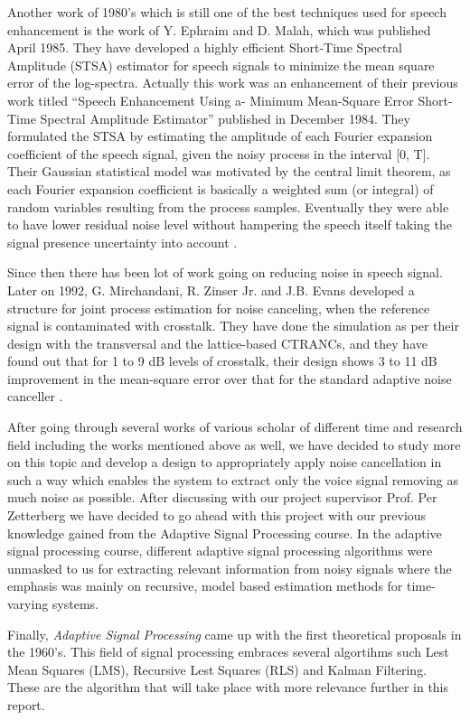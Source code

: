 \documentclass[11pt,a4paper,english]{book}  %
\theoremstyle{definition}  %
\theoremstyle{plain}  %
\theoremstyle{remark}  %
\begin{document}
Another work of 1980’s which is still one of the best techniques used for speech enhancement is the work of Y. Ephraim and D. Malah, which was published April 1985. They have developed a highly efficient Short-Time Spectral Amplitude (STSA) estimator for speech signals to minimize the mean square error of the log-spectra. Actually this work was an enhancement of their previous work titled “Speech Enhancement Using a- Minimum Mean-Square Error Short-Time Spectral Amplitude Estimator” published in December 1984. They formulated the STSA by estimating the amplitude of each Fourier expansion coefficient of the speech signal, given the noisy process in the interval [0, T]. Their Gaussian statistical model was motivated by the central limit theorem, as each Fourier expansion coefficient is basically a weighted sum (or integral) of random variables resulting from the process samples. Eventually they were able to have lower residual noise level without hampering the speech itself taking the signal presence uncertainty into account \cite{speech} \cite{logmmse}.

Since then there has been lot of work going on reducing noise in speech signal. Later on 1992, G. Mirchandani, R. Zinser Jr. and J.B. Evans developed a structure for joint process estimation for noise canceling, when the reference signal is contaminated with crosstalk. They have done the simulation as per their design with the transversal and the lattice-based CTRANCs, and they have found out that for 1 to 9 dB levels of crosstalk, their design shows 3 to 11 dB improvement in the mean-square error over that for the standard adaptive noise canceller \cite{crosstalk}.

After going through several works of various scholar of different time and research field including the works mentioned above as well, we have decided to study more on this topic and develop a design to appropriately apply noise cancellation in such a way which enables the system to extract only the voice signal removing as much noise as possible. After discussing with our project supervisor Prof. Per Zetterberg we have decided to go ahead with this project with our previous knowledge gained from the Adaptive Signal Processing course. In the adaptive signal processing course, different adaptive signal processing algorithms were unmasked to us for extracting relevant information from noisy signals where the emphasis was mainly on recursive, model based estimation methods for time-varying systems. 

Finally, \textit{Adaptive Signal Processing} came up with the first theoretical proposals in the 1960's. This field of signal processing embraces several algortihms such Lest Mean Squares (LMS), Recursive Lest Squares (RLS) and Kalman Filtering. These are the algorithm that will take place with more relevance further in this report.
\end{document}
